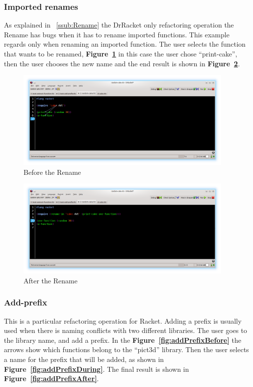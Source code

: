 \subsubsection{Imported renames}
As explained in ~\ref{ssub:Rename} the DrRacket only refactoring operation the Rename has bugs when it has to rename imported functions.
This example regards only when renaming an imported function. The user selects the function that wants to be renamed, {\bf Figure~\ref{fig:renameBefore}} in this case the user chose ``print-cake'', then the user chooses the new name and the end result is shown in {\bf Figure~\ref{fig:renameAfter}}.
\begin{figure}[htbp]
	\centering
	\includegraphics[width=0.95\textwidth]{img/rename1.png}
	\caption{Before the Rename}
	\label{fig:renameBefore}
\end{figure}

\begin{figure}[htbp]
	\centering
	\includegraphics[width=0.95\textwidth]{img/rename2.png}
	\caption{After the Rename}
	\label{fig:renameAfter}
\end{figure}

\subsubsection{Add-prefix}

This is a particular refactoring operation for Racket. Adding a prefix is usually used when there is naming conflicts with two different libraries. The user goes to the library name, and add a prefix.
In the {\bf Figure~\ref{fig:addPrefixBefore}} the arrows show which functions belong to the ``pict3d'' library.
Then the user selects a name for the prefix that will be added, as shown in {\bf Figure~\ref{fig:addPrefixDuring}}. The final result is shown in {\bf Figure~\ref{fig:addPrefixAfter}}.

